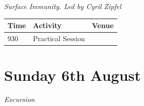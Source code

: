 \documentclass[12pt,]{book}
\theoremstyle{definition}
\theoremstyle{definition}
\theoremstyle{remark}
\begin{document}
\emph{Surface Immunity. Led by Cyril Zipfel}

\begin{longtable}[]{@{}lll@{}}
\toprule
\begin{minipage}[b]{0.09\columnwidth}\raggedright\strut
Time\strut
\end{minipage} & \begin{minipage}[b]{0.23\columnwidth}\raggedright\strut
Activity\strut
\end{minipage} & \begin{minipage}[b]{0.09\columnwidth}\raggedright\strut
Venue\strut
\end{minipage}\tabularnewline
\midrule
\endhead
\begin{minipage}[t]{0.09\columnwidth}\raggedright\strut
930\strut
\end{minipage} & \begin{minipage}[t]{0.23\columnwidth}\raggedright\strut
Practical Session\strut
\end{minipage} & \begin{minipage}[t]{0.09\columnwidth}\raggedright\strut
\strut
\end{minipage}\tabularnewline
\bottomrule
\end{longtable}

\section*{Sunday 6th August}\label{sunday-6th-august}

\emph{Excursion}
\end{document}
